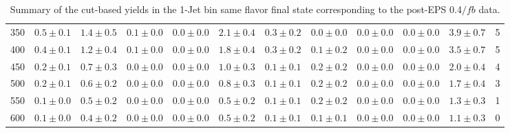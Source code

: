 \begin{table}[!hb]
{\begin{center}
\begin{tabular}{l c c c c c c c c c c c }
350 & $0.5\pm0.1$ & $1.4\pm0.5$ & $0.1\pm0.0$ & $0.0\pm0.0$ & $2.1\pm0.4$ & $0.3\pm0.2$ & $0.0\pm0.0$ & $0.0\pm0.0$ & $0.0\pm0.0$ & $3.9\pm0.7$ & 5 \\
400 & $0.4\pm0.1$ & $1.2\pm0.4$ & $0.1\pm0.0$ & $0.0\pm0.0$ & $1.8\pm0.4$ & $0.3\pm0.2$ & $0.1\pm0.2$ & $0.0\pm0.0$ & $0.0\pm0.0$ & $3.5\pm0.7$ & 5 \\
450 & $0.2\pm0.1$ & $0.7\pm0.3$ & $0.0\pm0.0$ & $0.0\pm0.0$ & $1.0\pm0.3$ & $0.1\pm0.1$ & $0.2\pm0.2$ & $0.0\pm0.0$ & $0.0\pm0.0$ & $2.0\pm0.4$ & 4 \\
500 & $0.2\pm0.1$ & $0.6\pm0.2$ & $0.0\pm0.0$ & $0.0\pm0.0$ & $0.8\pm0.3$ & $0.1\pm0.1$ & $0.2\pm0.2$ & $0.0\pm0.0$ & $0.0\pm0.0$ & $1.7\pm0.4$ & 3 \\
550 & $0.1\pm0.0$ & $0.5\pm0.2$ & $0.0\pm0.0$ & $0.0\pm0.0$ & $0.5\pm0.2$ & $0.1\pm0.1$ & $0.2\pm0.2$ & $0.0\pm0.0$ & $0.0\pm0.0$ & $1.3\pm0.3$ & 1 \\
600 & $0.1\pm0.0$ & $0.4\pm0.2$ & $0.0\pm0.0$ & $0.0\pm0.0$ & $0.5\pm0.2$ & $0.1\pm0.1$ & $0.1\pm0.1$ & $0.0\pm0.0$ & $0.0\pm0.0$ & $1.1\pm0.3$ & 0 \\
\hline
\end{tabular}
\end{center}
}
\caption{Summary of the cut-based yields in the 1-Jet bin same flavor final state corresponding to the post-EPS 0.4$/fb$ data.}
\end{table}
